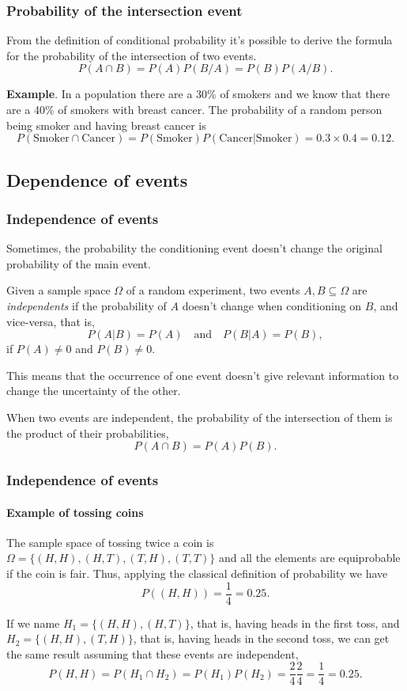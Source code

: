 \begin{frame}
\frametitle{Probability of the intersection event}
From the definition of conditional probability it's possible to derive the formula for the probability of the
intersection of two events. 
\[
P(A\cap B) = P(A)P(B/A) = P(B)P(A/B).
\]

\textbf{Example}. In a population there are a 30\% of smokers and we know that there are a 40\% of smokers with breast
cancer. 
The probability of a random person being smoker and having breast cancer is 
\[
P(\mbox{Smoker}\cap \mbox{Cancer})= P(\mbox{Smoker})P(\mbox{Cancer}|\mbox{Smoker}) =
0.3\times 0.4 = 0.12.
\]
\end{frame}


\subsection{Dependence of events}

\begin{frame}
\frametitle{Independence of events}
Sometimes, the probability the conditioning event doesn't change the original probability of the main event. 
\begin{definition}
Given a sample space $\Omega$ of a random experiment, two events  $A,B\subseteq \Omega$ are \emph{independents} if the
probability of $A$ doesn't change when conditioning on $B$, and vice-versa, that is,
\[
P(A|B) = P(A) \quad \mbox{and} \quad P(B|A)=P(B),
\]
if $P(A)\neq 0$ and $P(B)\neq 0$.
\end{definition}

This means that the occurrence of one event doesn't give relevant information to change the uncertainty of the other.

When two events are independent, the probability of the intersection of them is the product of their probabilities,
\[
P(A\cap B) = P(A)P(B).
\]
\end{frame}


\begin{frame}
\frametitle{Independence of events}
\framesubtitle{Example of tossing coins}
The sample space of tossing twice a coin is $\Omega=\{(H,H),(H,T),(T,H),(T,T)\}$ and all the elements are equiprobable
if the coin is fair. 
Thus, applying the classical definition of probability we have 
\[
P((H,H)) = \frac{1}{4} = 0.25.
\]

If we name $H_1=\{(H,H),(H,T)\}$, that is, having heads in the first toss, and $H_2=\{(H,H),(T,H)\}$, that is, having
heads in the second toss, we can get the same result assuming that these events are independent,
\[
P(H,H)= P(H_1\cap H_2) = P(H_1)P(H_2) = \frac{2}{4}\frac{2}{4}=\frac{1}{4}=0.25.
\] 
\end{frame}


